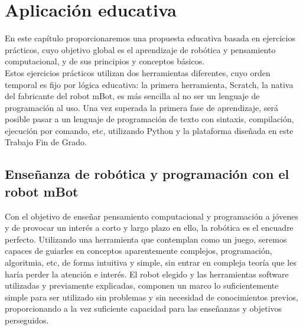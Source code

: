 \chapter{Aplicación educativa}\label{cap:aplicationEducativa}
En este capítulo proporcionaremos una propuesta educativa  basada en ejercicios prácticos, cuyo objetivo global es el aprendizaje de robótica y pensamiento computacional, y de sus principios y conceptos básicos. \\
Estos ejercicios prácticos utilizan dos herramientas diferentes, cuyo orden temporal es fijo por lógica educativa: la primera herramienta, Scratch, la nativa del fabricante del robot mBot, es más sencilla al no ser un lenguaje de programación al uso. Una vez superada la primera fase de aprendizaje, será posible pasar a un lenguaje de programación de texto con sintaxis, compilación, ejecución por comando, etc, utilizando Python y la plataforma diseñada en este Trabajo Fin de Grado. 

\section{Enseñanza de robótica y programación con el robot mBot}\label{sec:enseñanzarobotica}
 Con el objetivo de enseñar pensamiento computacional y programación a jóvenes y de provocar un interés a corto y largo plazo en ello, la robótica es el encuadre perfecto. Utilizando una herramienta que contemplan como un juego, seremos capaces de guiarles en conceptos aparentemente complejos, programación, algoritmia, etc, de forma intuitiva y simple, sin entrar en compleja teoría que les haría perder la atención e interés. El robot elegido y las herramientas software utilizadas y previamente explicadas, componen un marco lo suficientemente simple para ser utilizado sin problemas y sin necesidad de conocimientos previos, proporcionando a la vez suficiente capacidad para las enseñanzas y objetivos perseguidos.
